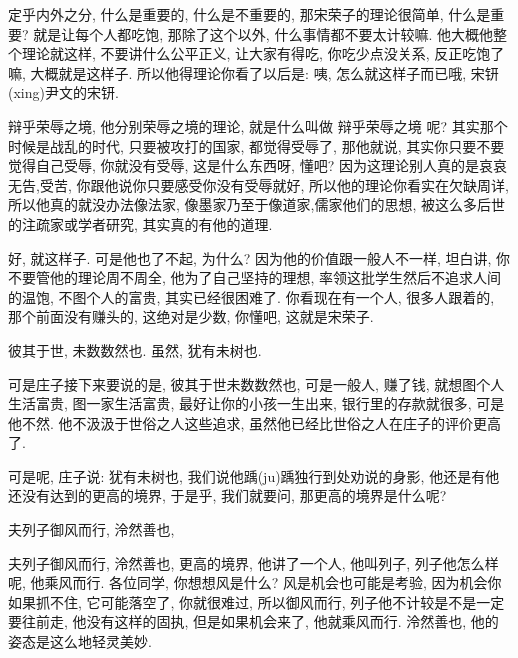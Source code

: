 \documentclass[11pt]{article}
\begin{document}
{\color{blue} 定乎内外之分}, 什么是重要的, 什么是不重要的, 那宋荣子的理论很简单, 什么是重要? 就是让每个人都吃饱, 那除了这个以外, 什么事情都不要太计较嘛. 他大概他整个理论就这样, 不要讲什么公平正义, 让大家有得吃, 你吃少点没关系, 反正吃饱了嘛, 大概就是这样子. 所以他得理论你看了以后是: 咦, 怎么就这样子而已哦, 宋钘(xing)尹文的宋钘.

{\color{blue} 辩乎荣辱之境}, 他分别荣辱之境的理论, 就是什么叫做 {\color{blue} 辩乎荣辱之境} 呢? 其实那个时候是战乱的时代, 只要被攻打的国家, 都觉得受辱了, 那他就说, 其实你只要不要觉得自己受辱, 你就没有受辱, 这是什么东西呀, 懂吧? 因为这理论别人真的是哀哀无告,受苦, 你跟他说你只要感受你没有受辱就好, 所以他的理论你看实在欠缺周详, 所以他真的就没办法像法家, 像墨家乃至于像道家,儒家他们的思想, 被这么多后世的注疏家或学者研究, 其实真的有他的道理.

好, 就这样子. 可是他也了不起, 为什么? 因为他的价值跟一般人不一样, 坦白讲, 你不要管他的理论周不周全, 他为了自己坚持的理想, 率领这批学生然后不追求人间的温饱, 不图个人的富贵, 其实已经很困难了. 你看现在有一个人, 很多人跟着的, 那个前面没有赚头的, 这绝对是少数, 你懂吧, 这就是宋荣子.

\begin{center}
	{\color{magenta} 彼其于世, 未数数然也. 虽然, 犹有未树也.}
\end{center}

\vspace{-0.5cm}

可是庄子接下来要说的是, {\color{blue} 彼其于世未数数然也}, 可是一般人, 赚了钱, 就想图个人生活富贵, 图一家生活富贵, 最好让你的小孩一生出来, 银行里的存款就很多, 可是他不然. 他不汲汲于世俗之人这些追求, 虽然他已经比世俗之人在庄子的评价更高了. 

可是呢, 庄子说: {\color{blue}犹有未树也}, 我们说他踽(ju)踽独行到处劝说的身影, 他还是有他还没有达到的更高的境界, 于是乎, 我们就要问, 那更高的境界是什么呢? 


\begin{center}
	{\color{magenta} 夫列子御风而行, 泠然善也,}
\end{center}

\vspace{-0.5cm}

{\color{blue}  夫列子御风而行, 泠然善也}, 更高的境界, 他讲了一个人, 他叫列子, 列子他怎么样呢, 他乘风而行. 各位同学, 你想想风是什么? 风是机会也可能是考验, 因为机会你如果抓不住, 它可能落空了, 你就很难过, 所以御风而行, 列子他不计较是不是一定要往前走, 他没有这样的固执, 但是如果机会来了, 他就乘风而行. {\color{blue} 泠然善也}, 他的姿态是这么地轻灵美妙.
\end{document}
